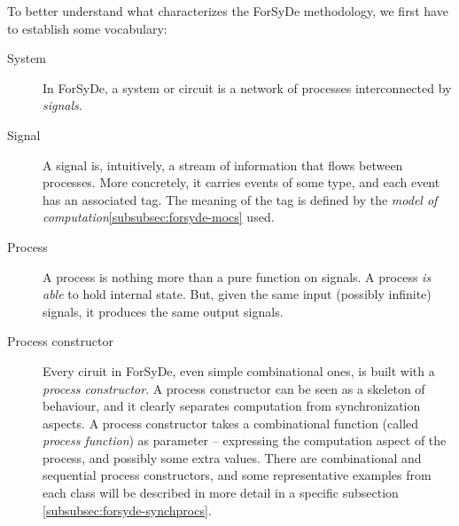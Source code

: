 \documentclass[a4paper]{article}
\begin{document}
            To better understand what characterizes the ForSyDe methodology, we first have to
            establish some vocabulary:
            \begin{description}
                \item[System] In ForSyDe, a system or circuit is a network of processes
                    interconnected by \emph{signals}.
                \item[Signal] A signal is, intuitively, a stream of information that flows between
                    processes. More concretely, it carries events of some type, and each event has
                    an associated tag. The meaning of the tag is defined by the \emph{model of
                    computation}\ref{subsubsec:forsyde-mocs} used.
                \item[Process] A process is nothing more than a pure function on signals. A process
                    \emph{is able} to hold internal state. But, given the same input (possibly
                    infinite) signals, it produces the same output signals.
                \item[Process constructor] Every ciruit in ForSyDe, even simple combinational ones,
                    is built with a \emph{process constructor}. A process constructor can be seen as
                    a skeleton of behaviour, and it clearly separates computation from
                    synchronization aspects. A process constructor takes a combinational function
                    (called \emph{process function}) as parameter -- expressing the computation
                    aspect of the process, and possibly some extra values. There are combinational
                    and sequential process constructors, and some representative examples from each
                    class will be described in more detail in a specific subsection
                    \ref{subsubsec:forsyde-synchprocs}.
            \end{description}
\end{document}

